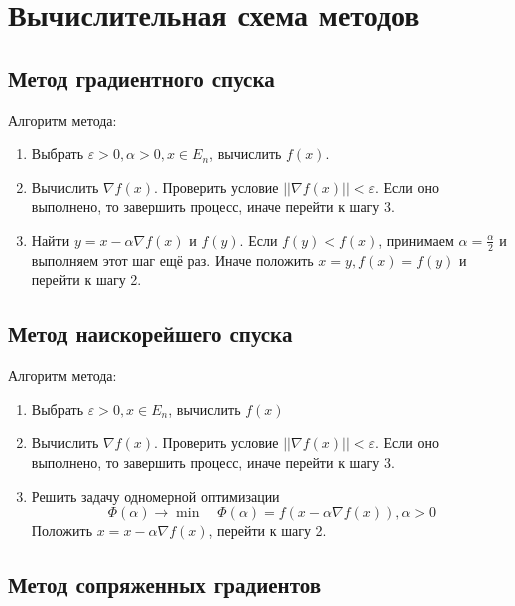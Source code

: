 	\section{Вычислительная схема методов}
	
	\subsection{Метод градиентного спуска}
	
	Алгоритм метода:
	\begin{enumerate}
		\item Выбрать \(\varepsilon > 0, \alpha > 0, x\in E_n\), вычислить \(f(x)\).
		\item Вычислить \(\nabla f(x)\). Проверить условие \(||\nabla f(x)|| < \varepsilon\). Если оно выполнено, то завершить процесс, иначе перейти к шагу 3.
		\item Найти \(y = x - \alpha \nabla f(x)\) и \(f(y)\). Если \(f(y) < f(x)\), принимаем \(\alpha = \frac{\alpha}{2}\) и выполняем этот шаг ещё раз. Иначе положить \(x = y, f(x) = f(y)\) и перейти к шагу 2.
	\end{enumerate}
	
	\subsection{Метод наискорейшего спуска}
	
	Алгоритм метода:
	\begin{enumerate}
		\item Выбрать \(\varepsilon > 0, x \in E_n\), вычислить \(f(x)\)
		\item Вычислить \(\nabla f(x)\). Проверить условие \(||\nabla f(x)|| < \varepsilon\). Если оно выполнено, то завершить процесс, иначе перейти к шагу 3.
		\item Решить задачу одномерной оптимизации
		\[\Phi(\alpha) \to \min \quad \Phi(\alpha) = f(x - \alpha \nabla f(x)), \alpha > 0\]
		Положить \(x = x - \alpha \nabla f(x)\), перейти к шагу 2.
	\end{enumerate}
	
	\subsection{Метод сопряженных градиентов}
	
